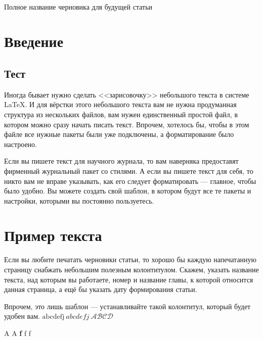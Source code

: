 \documentclass[a4paper,12pt]{article}
\begin{document}
{~}\bigskip
\begin{center}
\Huge{Полное название черновика для будущей статьи}
\end{center}

\section{Введение}
\subsection{Тест}
Иногда бывает нужно сделать <<зарисовочку>> небольшого текста в системе \LaTeX. И для вёрстки этого небольшого текста вам не нужна продуманная структура из нескольких файлов, вам нужен единственный простой файл, в котором можно сразу начать писать текст. Впрочем, хотелось бы, чтобы в этом файле все нужные пакеты были уже подключены, а форматирование было настроено. 

Если вы пишете текст для научного журнала, то вам наверняка предоставят фирменный журнальный пакет со стилями. А если вы пишете текст для себя, то никто вам не вправе указывать, как его следует форматировать --- главное, чтобы было удобно. Вы можете создать свой шаблон, в котором будут все те пакеты и настройки, которыми вы постоянно пользуетесь.

\clearpage
\section{Пример текста}
Если вы любите печатать черновики статьи, то хорошо бы каждую напечатанную страницу снабжать небольшим полезным колонтитулом. Скажем, указать название текста, над которым вы работаете, номер и название главы, к которой относится данная страница, а ещё бы указать дату формирования статьи.

Впрочем, это лишь шаблон --- устанавливайте такой колонтитул, который будет удобен вам.
$\mathrm{abcdefj} \ abcdefj \ \mathcal{ABCD}$

A {A \bfseries f} f f
\end{document}

